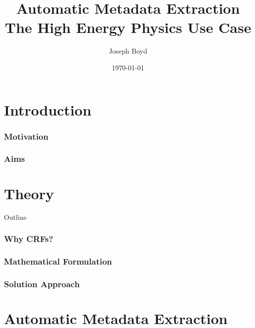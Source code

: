 \documentclass{beamer}
\title[Automatic Metadata Extraction]{Automatic Metadata Extraction \\ The High Energy Physics Use Case} %
\author{Joseph Boyd} %
\institute[EPFL] %
{
\'Ecole Polytechnique F\'ed\'erale de Lausanne \\ %
\medskip
\textit{joseph.boyd@epfl.ch} %
}
\date{\today} %
\begin{document}
\begin{frame}
\titlepage %
\end{frame}


\section{Introduction}


\begin{frame}
\frametitle{Motivation}
\end{frame}


\begin{frame}
\frametitle{Aims}
\end{frame}


\section{Theory}


\begin{frame}[noframenumbering]{Outline}
\end{frame}


\begin{frame}
\frametitle{Why CRFs?}
\end{frame}


\begin{frame}
\frametitle{Mathematical Formulation}
\end{frame}


\begin{frame}
\frametitle{Solution Approach}
\end{frame}


\section{Automatic Metadata Extraction}
\end{document}
